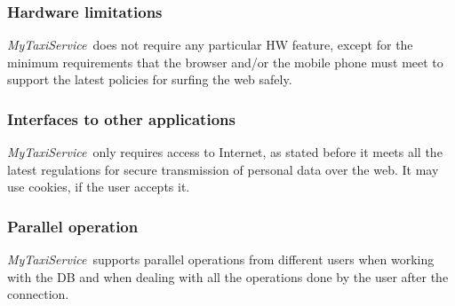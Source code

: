 \documentclass[a4paper,11pt]{report} %
\newcommand{\mts}{\mbox{\normalfont\itshape MyTaxiService\ }}
\begin{document}
	\subsubsection{Hardware limitations} \mts does not require any particular HW feature, except for the minimum requirements that the browser and/or the mobile phone must meet to support the latest policies for surfing the web safely.
	
	\subsubsection{Interfaces to other applications} \mts only requires access to Internet, as stated before it meets all the latest regulations for secure transmission of personal data over the web. It may use cookies, if the user accepts it.
	
	\subsubsection{Parallel operation} \mts supports parallel operations from different users when working	with the DB and when dealing with all the operations done by the user after the connection.
	
\end{document}
